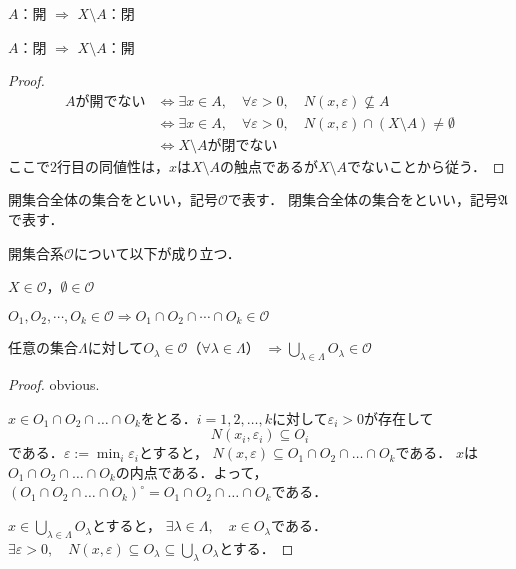 \documentclass[uplatex]{jsarticle}
\begin{document}
\begin{prop}
     $A$：開 $\Longrightarrow$ $X \setminus A$：閉

     $A$：閉 $\Longrightarrow$ $X \setminus A$：開
\end{prop}

\begin{proof}
    \begin{align*}
        A\text{が開でない} & \Longleftrightarrow \exists x \in A, \quad \forall \varepsilon > 0, \quad N(x, \varepsilon) \not\subseteq A \\
        & \Longleftrightarrow \exists x \in A, \quad \forall \varepsilon > 0, \quad N(x, \varepsilon) \cap (X \setminus A) \neq \emptyset \\
        & \Longleftrightarrow X \setminus A \text{が閉でない}
    \end{align*}
    ここで2行目の同値性は，$x$は$X \setminus A$の触点であるが$X \setminus A$でないことから従う．
\end{proof}

開集合全体の集合をといい，記号$\mathcal{O}$で表す．
閉集合全体の集合をといい，記号$\mathfrak{A}$で表す．

\begin{prop}
    \label{prop:open_set_axiom}
    開集合系$\mathcal{O}$について以下が成り立つ．

     $X \in \mathcal{O}$，$\emptyset \in \mathcal{O}$

     $O_{1}, O_{2}, \cdots, O_{k} \in \mathcal{O} \Longrightarrow O_{1} \cap O_{2} \cap \cdots \cap O_{k} \in \mathcal{O}$

     任意の集合$\Lambda$に対して$O_{\lambda} \in \mathcal{O}$（$\forall \lambda \in \Lambda$） ${\displaystyle \Longrightarrow \bigcup_{\lambda \in \Lambda} O_{\lambda} \in \mathcal{O}}$
\end{prop}

\begin{proof}
     obvious.

     $x \in O_{1} \cap O_{2} \cap \dots \cap O_{k}$をとる．$i = 1,2,\dots,k$に対して$\varepsilon_{i} > 0$が存在して
    \begin{equation}
        N(x_{i}, \varepsilon_{i}) \subseteq O_{i}
    \end{equation}
    である．${\displaystyle \varepsilon := \min_{i} \varepsilon_{i}}$とすると，
    $N(x, \varepsilon) \subseteq O_{1} \cap O_{2} \cap \dots \cap O_{k}$である．
    $x$は$O_{1} \cap O_{2} \cap \dots \cap O_{k}$の内点である．よって，$\left( O_{1} \cap O_{2} \cap \dots \cap O_{k} \right)^{\circ} = O_{1} \cap O_{2} \cap \dots \cap O_{k}$である．

     ${x \in \displaystyle \bigcup_{\lambda \in \Lambda} O_{\lambda}}$とすると，
    $\exists \lambda \in \Lambda, \quad x \in O_{\lambda}$である．${\displaystyle \exists \varepsilon > 0, \quad N(x, \varepsilon) \subseteq O_{\lambda} \subseteq \bigcup_{\lambda} O_{\lambda}}$とする．
\end{proof}
\end{document}
